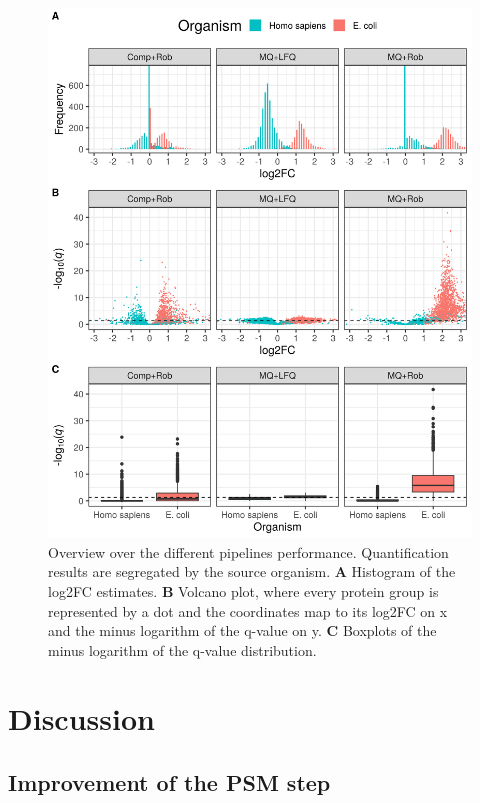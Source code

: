 \documentclass[11pt, a4paper]{report}
\begin{document}
\begin{figure}[!h]
\centering
\includegraphics[width=\textwidth]{combined_plot}
\caption{Overview over the different pipelines performance. Quantification results are segregated by the source organism. \textbf{A} Histogram of the \ac{log2FC} estimates. \textbf{B} Volcano plot, where every protein group is represented by a dot and the coordinates map to its \ac{log2FC} on x and the minus logarithm of the q-value on y. \textbf{C} Boxplots of the minus logarithm of the q-value distribution.}
\label{fig:combined_plot}
\end{figure}



\section{Discussion}

\subsection{Improvement of the PSM step}
\end{document}
